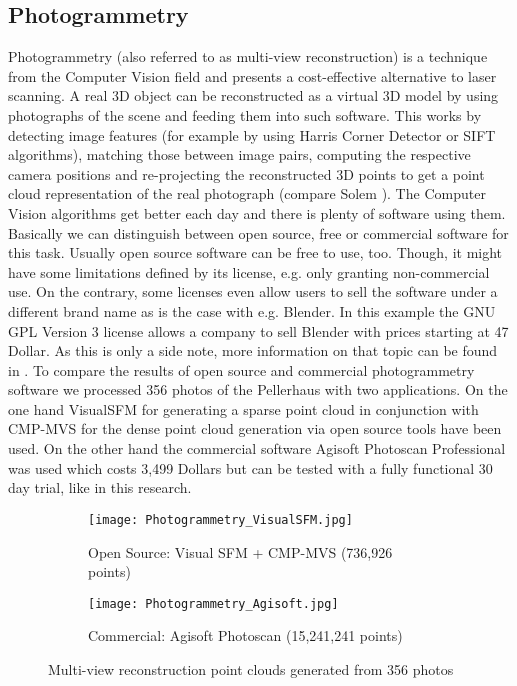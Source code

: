 \subsection{Photogrammetry}

Photogrammetry (also referred to as multi-view reconstruction) is a technique from the Computer Vision field and presents a cost-effective alternative to laser scanning. A real 3D object can be reconstructed as a virtual 3D model by using photographs of the scene and feeding them into such software. This works by detecting image features (for example by using Harris Corner Detector or SIFT algorithms), matching those between image pairs, computing the respective camera positions and re-projecting the reconstructed 3D points to get a point cloud representation of the real photograph (compare Solem \parencite[][p29]{bookProgrammingComputerVisionwithPython}).
The Computer Vision algorithms get better each day and there is plenty of software using them. Basically we can distinguish between open source, free or commercial software for this task. Usually open source software can be free to use, too. Though, it might have some limitations defined by its license, e.g. only granting non-commercial use. On the contrary, some licenses even allow users to sell the software under a different brand name as is the case with e.g. Blender. In this example the GNU GPL Version 3 license allows a company to sell Blender with prices starting at 47 Dollar. As this is only a side note, more information on that topic can be found in \parencite{blender_rebranding}.
To compare the results of open source and commercial photogrammetry software we processed 356 photos of the Pellerhaus with two applications. On the one hand VisualSFM for generating a sparse point cloud in conjunction with CMP-MVS for the dense point cloud generation via open source tools have been used. On the other hand the commercial software Agisoft Photoscan Professional was used which costs 3,499 Dollars but can be tested with a fully functional 30 day trial, like in this research.

\begin{figure}[h]
	\centering
	\begin{subfigure}[b]{1.0\textwidth}
		\centering
		\texttt{[image: Photogrammetry\_VisualSFM.jpg]}
		\caption{Open Source: Visual SFM + CMP-MVS (736,926 points)}
		\label{fig:visualsfm}
	\end{subfigure}
	\hfill
	\begin{subfigure}[b]{1.0\textwidth}
		\centering
		\texttt{[image: Photogrammetry\_Agisoft.jpg]}
		\caption{Commercial: Agisoft Photoscan (15,241,241 points)}
		\label{fig:photoscan}
	\end{subfigure}
	\caption{Multi-view reconstruction point clouds generated from 356 photos}
	\label{fig:multiview reconstruction pellerhaus}
\end{figure}

